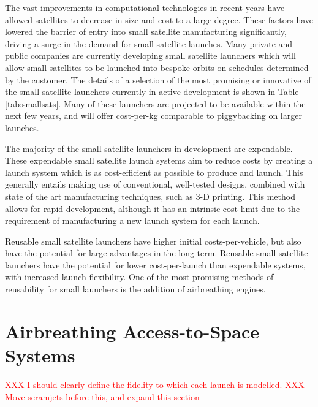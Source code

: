  
  The vast improvements in computational technologies in recent years have allowed satellites to decrease in size and cost to a large degree. These factors have lowered the barrier of entry into small satellite manufacturing significantly, driving a surge in the demand for small satellite launches. Many private and public companies are currently developing small satellite launchers which will allow small satellites to be launched into bespoke orbits on schedules determined by the customer\cite{Faa2018}. The details of a selection of the most promising or innovative of the small satellite launchers currently in active development is shown in Table \ref{tab:smallsats}. Many of these launchers are projected to be available within the next few years, and will offer cost-per-kg comparable to piggybacking on larger launches. 
  
  
  
  The majority of the small satellite launchers in development are expendable\cite{Niederstrasser2015}. These expendable small satellite launch systems aim to reduce costs by creating a launch system which is as cost-efficient as possible to produce and launch\cite{Niederstrasser2015}. This generally entails making use of conventional, well-tested designs, combined with state of the art manufacturing techniques, such as 3-D printing\cite{Niederstrasser2015,Gilmour}. This method allows for rapid development, although it has an intrinsic cost limit due to the requirement of manufacturing a new launch system for each launch.  
  
  Reusable small satellite launchers have higher initial costs-per-vehicle, but also have the potential for large advantages in the long term\cite{Preller2017b}. Reusable small satellite launchers have the potential for lower cost-per-launch than expendable systems, with increased launch flexibility\cite{Preller2017b}. 
 One of the most promising methods of reusability for small launchers is the addition of airbreathing engines\cite{Smart2009}.

   

  
  

  
  
  \section{Airbreathing Access-to-Space Systems}

  \textcolor{red}{XXX I should clearly define the fidelity to which each launch is modelled.}
  \textcolor{red}{XXX Move scramjets before this, and expand this section}
  
